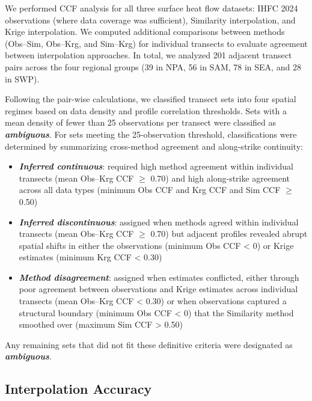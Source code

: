 \documentclass[draft,linenumbers]{agujournal2019}
\providecommand{\tightlist}{\setlength{\itemsep}{0pt}\setlength{\parskip}{0pt}}
\begin{document}
We performed CCF analysis for all three surface heat flow datasets: IHFC
2024 observations (where data coverage was sufficient), Similarity
interpolation, and Krige interpolation. We computed additional
comparisons between methods (Obs--Sim, Obs--Krg, and Sim--Krg) for
individual transects to evaluate agreement between interpolation
approaches. In total, we analyzed 201 adjacent transect pairs across the
four regional groups (39 in NPA, 56 in SAM, 78 in SEA, and 28 in SWP).

Following the pair-wise calculations, we classified transect sets into
four spatial regimes based on data density and profile correlation
thresholds. Sets with a mean density of fewer than 25 observations per
transect were classified as \textbf{\emph{ambiguous}}. For sets meeting
the 25-observation threshold, classifications were determined by
summarizing cross-method agreement and along-strike continuity:

\begin{itemize}
\tightlist
\item
  \textbf{\emph{Inferred continuous}}: required high method agreement
  within individual transects (mean Obs--Krg CCF \(\geq\) 0.70) and high
  along-strike agreement across all data types (minimum Obs CCF and Krg
  CCF and Sim CCF \(\geq\) 0.50)
\item
  \textbf{\emph{Inferred discontinuous}}: assigned when methods agreed
  within individual transects (mean Obs--Krg CCF \(\geq\) 0.70) but
  adjacent profiles revealed abrupt spatial shifts in either the
  observations (minimum Obs CCF \textless{} 0) or Krige estimates
  (minimum Krg CCF \textless{} 0.30)
\item
  \textbf{\emph{Method disagreement}}: assigned when estimates
  conflicted, either through poor agreement between observations and
  Krige estimates across individual transects (mean Obs--Krg CCF
  \textless{} 0.30) or when observations captured a structural boundary
  (minimum Obs CCF \textless{} 0) that the Similarity method smoothed
  over (maximum Sim CCF \textgreater{} 0.50)
\end{itemize}

Any remaining sets that did not fit these definitive criteria were
designated as \textbf{\emph{ambiguous}}.

\subsection{Interpolation Accuracy}\label{sec:interpolation-accuracy}
\end{document}
